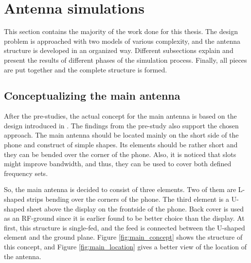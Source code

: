\section{Antenna simulations}
\label{sec:simulations}
This section contains the majority of the work done for this thesis. The design problem is approached with two models of various complexity, and the antenna structure is developed in an organized way. Different subsections explain and present the results of different phases of the simulation process. Finally, all pieces are put together and the complete structure is formed.


\subsection{Conceptualizing the main antenna}
\label{sec:conceptualizing}
After the pre-studies, the actual concept for the main antenna is based on the design introduced in \cite{kimmo}. The findings from the pre-study also support the chosen approach. The main antenna should be located mainly on the short side of the phone and construct of simple shapes. Its elements should be rather short and they can be bended over the corner of the phone. Also, it is noticed that slots might improve bandwidth, and thus, they can be used to cover both defined frequency sets. 

So, the main antenna is decided to consist of three elements. Two of them are L-shaped strips bending over the corners of the phone. The third element is a U-shaped sheet above the display on the frontside of the phone. Back cover is used as an RF-ground since it is earlier found to be better choice than the display. At first, this structure is single-fed, and the feed is connected between the U-shaped element and the ground plane. Figure \ref{fig:main_concept} shows the structure of this concept, and Figure \ref{fig:main_location} gives a better view of the location of the antenna.

